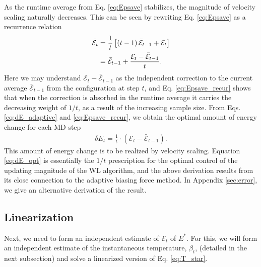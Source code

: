 \documentclass[reprint]{revtex4-1}
\begin{document}
As the runtime average from Eq. \eqref{eq:Epsave}
stabilizes, the magnitude of velocity scaling
naturally decreases.
%
This can be seen by rewriting Eq. \eqref{eq:Epsave}
as a recurrence relation
%
\begin{align}
  \bar{\mathcal E}_t
  &=
  \frac{1}{t}
  \left[
    (t - 1) \, \bar{\mathcal E}_{t - 1}
    + \mathcal E_t
  \right]
  \notag \\
  &=
  \bar{\mathcal E}_{t - 1}
  +
  \frac{
    \mathcal E_t - \bar{\mathcal E}_{t - 1}
  }
  {
    t
  }
  .
\label{eq:Epsave_recur}
\end{align}
%
Here we may understand $\mathcal E_t - \bar{\mathcal E}_{t - 1}$
as the independent correction
to the current average $\bar{\mathcal E}_{t - 1}$
from the configuration at step $t$,
and Eq. \eqref{eq:Epsave_recur} shows that
when the correction is absorbed in the runtime average
it carries the decreasing weight of $1/t$,
as a result of the increasing sample size.
%
From Eqs. \eqref{eq:dE_adaptive} and \eqref{eq:Epsave_recur},
we obtain the optimal amount of energy change
for each MD step
\begin{align}
  \delta E_t
  =
  \frac{ 1 } { t }
  \cdot
  \left( \mathcal E_t - \bar{\mathcal E}_{t - 1} \right)
  .
  \label{eq:dE_opt}
\end{align}
%
This amount of energy change is to be realized by velocity scaling.
%
Equation \eqref{eq:dE_opt} is essentially
the $1/t$ prescription\cite{
  belardinelli2007, *belardinelli2007jcp, *belardinelli2008,
  zhou2005, *zhou2008, *morozov2007}
for the optimal control of the updating magnitude
of the WL algorithm\cite{wang2001, *wang2001pre},
and the above derivation results from its close connection\cite{
  marsili2006, barducci2008}
to the adaptive biasing force method\cite{darve2001, *darve2008}.
%
In Appendix \ref{sec:error}, we give an alternative derivation of the result.



\subsection{Linearization}



Next, we need to form an independent estimate of
$\mathcal E_t$ of $E^*$.
%
For this, we will form
an independent estimate of
the instantaneous temperature, $\beta_t$,
(detailed in the next subsection)
and solve a linearized version of Eq. \eqref{eq:T_star}.
\end{document}

